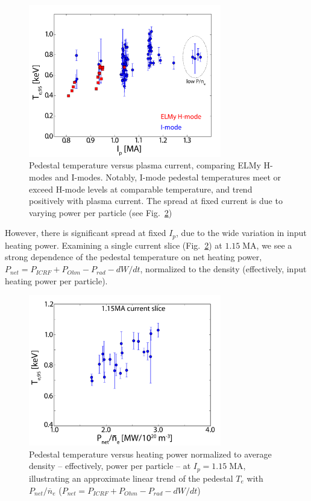 \documentclass[12pt]{iopart}
\begin{document}
\begin{figure}[ht]
 \centering
 \includegraphics[width=0.75\textwidth]{Ip_Te95.pdf}
 \caption{Pedestal temperature versus plasma current, comparing ELMy H-modes and I-modes.  Notably, I-mode pedestal temperatures meet or exceed H-mode levels at comparable temperature, and trend positively with plasma current.  The spread at fixed current is due to varying power per particle (see Fig.~\ref{fig:Pnebar_Te95})}
 \label{fig:Ip_Te95}
\end{figure}

However, there is significant spread at fixed $I_p$, due to the wide variation in input heating power.
Examining a single current slice (Fig.~\ref{fig:Pnebar_Te95}) at $1.15\;\mbox{MA}$, we see a strong dependence of the pedestal temperature on net heating power, $P_{net} = P_{ICRF} + P_{Ohm} - P_{rad} - dW/dt$, normalized to the density (effectively, input heating power per particle).

\begin{figure}[ht]
 \centering
 \includegraphics[width=0.75\textwidth]{Pnebar_Te95_115MA.pdf}
 \caption{Pedestal temperature versus heating power normalized to average density -- effectively, power per particle -- at $I_p = 1.15\;\mbox{MA}$, illustrating an approximate linear trend of the pedestal $T_e$ with $P_{net}/\overline{n}_e$ ($P_{net} = P_{ICRF} + P_{Ohm} - P_{rad} - dW/dt$)}
 \label{fig:Pnebar_Te95}
\end{figure}
\end{document}
